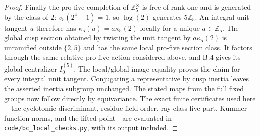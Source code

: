 \begin{proof}
Finally the pro-five completion of $\mathbb Z_5^\times$ is
free of rank one and is generated by the class of $2$:
$v_5(2^4-1)=1$, so $\log(2)$ generates $5\mathbb Z_5$.
An integral unit tangent $u$ therefore has
$\kappa_5(u)=a\kappa_5(2)$ locally for a unique $a\in\mathbb Z_5$.
The global cusp section obtained by twisting the unit tangent
by $a\kappa_5(2)$ is unramified outside $\{2,5\}$ and has the
same local pro-five section class.  It factors through the
same relative pro-five action considered above, and B.4 gives
its global centralizer $I_0^{(5)}$.  The local/global image
equality proves the claim for every integral unit tangent.
Conjugating a representative by cusp inertia leaves the
asserted inertia subgroup unchanged.  The stated maps from
the full fixed groups now follow directly by equivariance.
The exact finite certificates used here---the cyclotomic
discriminant, residue-field order, ray-class five-part,
Kummer-function norms, and the lifted point---are evaluated
in \texttt{code/bc\_local\_checks.py}, with its output included.
\end{proof}

